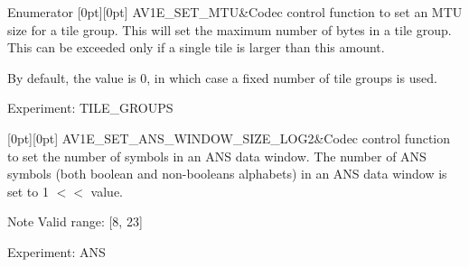 \begin{DoxyEnumFields}{Enumerator}
[0pt][0pt]{}\mbox{\label{group__aom__encoder_ggae78dde67a6d78f332e9bdba0dde42db5a353037d84b6c47ac0138fa843b70a2bb}} 
A\+V1\+E\+\_\+\+S\+E\+T\+\_\+\+M\+TU&Codec control function to set an M\+TU size for a tile group. This will set the maximum number of bytes in a tile group. This can be exceeded only if a single tile is larger than this amount.

By default, the value is 0, in which case a fixed number of tile groups is used.

Experiment\+: T\+I\+L\+E\+\_\+\+G\+R\+O\+U\+PS \\
\hline

[0pt][0pt]{}\mbox{\label{group__aom__encoder_ggae78dde67a6d78f332e9bdba0dde42db5a12575637cfea2f096a3f403933389979}} 
A\+V1\+E\+\_\+\+S\+E\+T\+\_\+\+A\+N\+S\+\_\+\+W\+I\+N\+D\+O\+W\+\_\+\+S\+I\+Z\+E\+\_\+\+L\+O\+G2&Codec control function to set the number of symbols in an A\+NS data window. The number of A\+NS symbols (both boolean and non-\/booleans alphabets) in an A\+NS data window is set to 1 $<$$<$ value.

\begin{DoxyNote}{Note}
Valid range\+: \mbox{[}8, 23\mbox{]}
\end{DoxyNote}
Experiment\+: A\+NS \\
\hline


\end{DoxyEnumFields}
